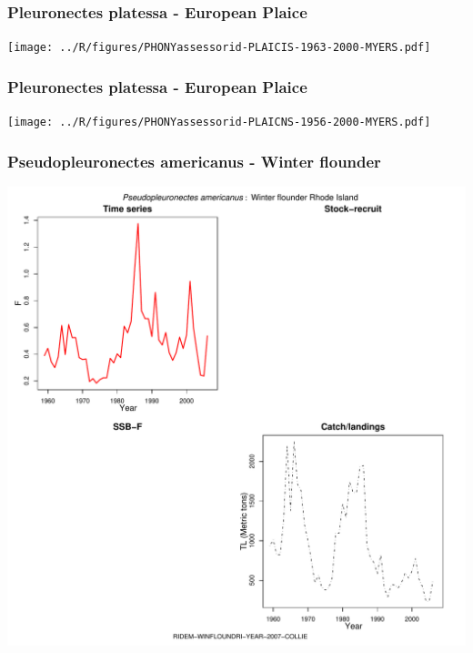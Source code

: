 \subsubsection{Pleuronectes platessa - European Plaice}
\begin{center}
\texttt{[image: ../R/figures/PHONYassessorid-PLAICIS-1963-2000-MYERS.pdf]}
\end{center}

\subsubsection{Pleuronectes platessa - European Plaice}
\begin{center}
\texttt{[image: ../R/figures/PHONYassessorid-PLAICNS-1956-2000-MYERS.pdf]}
\end{center}

\subsubsection{Pseudopleuronectes americanus - Winter flounder}
\begin{center}
\includegraphics[width=1.2\textwidth]{../R/figures/RIDEM-WINFLOUNDRI-YEAR-2007-COLLIE.pdf}
\end{center}

